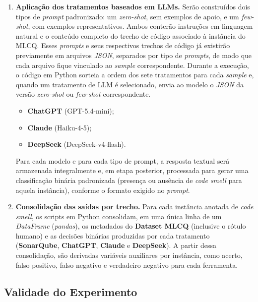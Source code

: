 \begin{enumerate}
    \item \textbf{Aplicação dos tratamentos baseados em LLMs.}
    Serão construídos dois tipos de \textit{prompt} padronizado: um \textit{zero-shot}, sem 
    exemplos de apoio, e um \textit{few-shot}, com exemplos representativos. Ambos conterão instruções em 
    linguagem natural e o conteúdo completo do trecho de código associado à instância do MLCQ. Esses \textit{prompts} e seus respectivos trechos de código já existirão previamente em arquivos \textit{JSON}, separados por tipo de \textit{prompts}, de modo que cada arquivo fique vinculado ao \textit{sample} correspondente. Durante a execução, o código em Python sorteia a ordem dos sete tratamentos para cada \textit{sample} e, quando um tratamento de LLM é selecionado, envia ao modelo o \textit{JSON} da versão \textit{zero-shot} ou \textit{few-shot} correspondente.

    \begin{itemize}
        \item \textbf{ChatGPT} (GPT-5.4-mini);
        \item \textbf{Claude} (Haiku-4-5);
        \item \textbf{DeepSeek} (DeepSeek-v4-flash).
    \end{itemize}

    Para cada modelo e para cada tipo de prompt, a resposta textual será armazenada
    integralmente e, em etapa posterior, processada para gerar uma classificação binária padronizada
    (presença ou ausência de \textit{code smell} para aquela instância), conforme o formato exigido no
    \textit{prompt}.


    \item \textbf{Consolidação das saídas por trecho.}
    Para cada instância anotada de \textit{code smell}, os scripts em Python consolidam, em uma única linha de um \textit{DataFrame} (\textit{pandas}), os metadados do 
    \textbf{Dataset MLCQ} (inclusive o rótulo humano) e as decisões binárias produzidas por cada tratamento (\textbf{SonarQube}, \textbf{ChatGPT}, 
    \textbf{Claude} e \textbf{DeepSeek}). A partir dessa consolidação, são derivadas variáveis auxiliares por instância, como acerto, 
    falso positivo, falso negativo e verdadeiro negativo para cada ferramenta.

\end{enumerate}



\subsection{Validade do Experimento}

